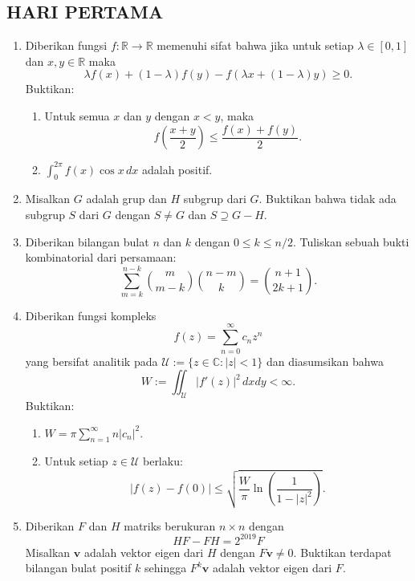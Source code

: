 \documentclass[12pt,twoside]{article}
\begin{document}
\subsection{HARI PERTAMA}
\begin{enumerate}
    \item Diberikan fungsi $f : \mathbb{R} \to \mathbb{R}$ memenuhi sifat bahwa jika untuk setiap $\lambda \in [0,1]$ dan $x, y \in \mathbb{R}$ maka
          \[
              \lambda f(x) + (1 - \lambda) f(y) - f(\lambda x + (1 - \lambda)y) \geq 0.
          \]
          Buktikan:
          \begin{enumerate}
              \item Untuk semua $x$ dan $y$ dengan $x < y$, maka
                    \[
                        f\left( \frac{x + y}{2} \right) \leq \frac{f(x) + f(y)}{2}.
                    \]
              \item
                    \(       \displaystyle \int_{0}^{2\pi} f(x) \cos x \, dx \)  adalah positif.
          \end{enumerate}

    \item Misalkan $G$ adalah grup dan $H$ subgrup dari $G$. Buktikan bahwa tidak ada subgrup $S$ dari $G$ dengan $S \ne G$ dan $S \supseteq G - H$.

    \item Diberikan bilangan bulat $n$ dan $k$ dengan $0 \leq k \leq n/2$. Tuliskan sebuah bukti kombinatorial dari persamaan:
          \[
              \sum_{m=k}^{n-k} \binom{m}{m - k} \binom{n - m}{k} = \binom{n + 1}{2k + 1}.
          \]

    \item Diberikan fungsi kompleks
          \[
              f(z) = \sum_{n=0}^{\infty} c_n z^n
          \]
          yang bersifat analitik pada $\mathcal{U} := \{ z \in \mathbb{C} : |z| < 1 \}$ dan diasumsikan bahwa
          \[
              W := \iint_{\mathcal{U}} |f'(z)|^2 \, dxdy < \infty.
          \]
          Buktikan:
          \begin{enumerate}
              \item
                    \(
                    W = \pi \sum_{n=1}^{\infty} n |c_n|^2.
                    \)
              \item Untuk setiap $z \in \mathcal{U}$ berlaku:
                    \[
                        |f(z) - f(0)| \leq \sqrt{ \frac{W}{\pi} \ln\left( \frac{1}{1 - |z|^2} \right) }.
                    \]
          \end{enumerate}

    \item Diberikan $F$ dan $H$ matriks berukuran $n \times n$ dengan
          \[
              HF - FH = 2^{2019} F
          \]
          Misalkan $\mathbf{v}$ adalah vektor eigen dari $H$ dengan $F\mathbf{v} \ne 0$. Buktikan terdapat bilangan bulat positif $k$ sehingga $F^k \mathbf{v}$ adalah vektor eigen dari $F$.
\end{enumerate}
\pagebreak
\end{document}
